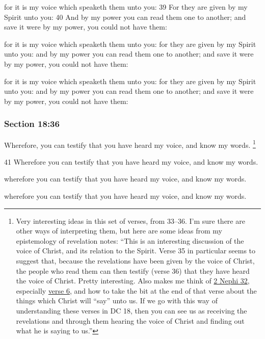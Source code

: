 		\begin{framed}
		\scriptsize
			\begin{compactdesc}
				\item[JSP] for it is my voice which speaketh them unto you: 39 For they are given by my Spirit unto you: 40 And by my power you can read them one to another; and save it were by my power, you could not have them:
				\item[DC 1835] for it is my voice which speaketh them unto you: for they are given by my Spirit unto you: and by my power you can read them one to another; and save it were by my power, you could not have them: 
				\item[DC 1844] for it is my voice which speaketh them unto you: for they are given by my Spirit unto you: and by my power you can read them one to another; and save it were by my power, you could not have them: 
			\end{compactdesc}
		\end{framed}

	\subsubsection{Section 18:36} %
		\label{DC18-36}

		Wherefore, you can testify that you have heard my voice, and know my words.%
		\footnote{%
			Very interesting ideas in this set of verses, from 33--36. I'm sure there are other ways of interpreting them, but here are some ideas from my epistemology of revelation notes: ``This is an interesting discussion of the voice of Christ, and its relation to the Spirit. Verse 35 in particular seems to suggest that, because the revelations have been given by the voice of Christ, the people who read them can then testify (verse 36) that they have heard the voice of Christ. Pretty interesting. Also makes me think of \hyperref[2NEPHI-32]{2 Nephi 32}, especially \hyperref[2NEPHI-32-6]{verse 6}, and how to take the bit at the end of that verse about the things which Christ will ``say'' unto us. If we go with this way of understanding these verses in DC 18, then you can see us as receiving the revelations and through them hearing the voice of Christ and finding out what he is saying to us.''
			} 

		\begin{framed}
		\scriptsize
			\begin{compactdesc}
				\item[JSP] 41 Wherefore you can testify that you have heard my voice, and know my words.
				\item[DC 1835] wherefore you can testify that you have heard my voice, and know my words.
				\item[DC 1844] wherefore you can testify that you have heard my voice, and know my words.
			\end{compactdesc}
		\end{framed}

